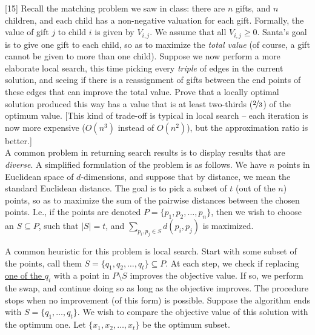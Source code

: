 \documentclass[addpoints]{exam}
\def\mysolution#1{}    %
\begin{document}
\begin{questions}
[15]
Recall the matching problem we saw in class: there are $n$ gifts, and $n$ children,
and each child has a non-negative valuation for each gift. Formally, the value of
gift $j$ to child $i$ is given by $V_{i,j}$. We assume that all $V_{i,j} \ge 0$.
Santa's goal is to give one gift to each child, so as to maximize the {\em total
value} (of course, a gift cannot be given to more than one child).
Suppose we now perform a more elaborate local search, this time picking every {\em
triple} of edges in the current solution, and seeing if there is a reassignment of
gifts between the end points of these edges that can improve the total value. Prove
that a locally optimal solution produced this way has a value that is at least two-thirds ($\nicefrac{2}{3}$) of the optimum value. [This kind of trade-off is typical in local search --
each iteration is now more expensive ($O(n^3)$ instead of $O(n^2)$), but the
approximation ratio is better.]\\


\mysolution{
    
}



A common problem in returning search results is to display results that are {\em diverse}. A simplified formulation of the problem is as follows. We have $n$ points in Euclidean space of $d$-dimensions, and suppose that by distance, we mean the standard Euclidean distance. The goal is to pick a subset of $t$ (out of the $n$) points, so as to maximize the sum of the pairwise distances between the chosen points. 
I.e., if the points are denoted $P = \{p_1, p_2, \dots, p_n\}$, then we wish to choose an $S \subseteq P$, such that $|S| = t$, and $\sum_{p_i, p_j \in S} d(p_i, p_j)$ is maximized.

A common heuristic for this problem is local search. Start with some subset of the points, call them $S = \{q_1, q_2, \dots, q_t\} \subseteq P$. At each step, we check if replacing \underline{one of the $q_i$} with a point in $P \setminus S$ improves the objective value.  If so, we perform the swap, and continue doing so as long as the objective improves. The procedure stops when no improvement (of this form) is possible. Suppose the algorithm ends with $S = \{q_1, \dots, q_t\}$.  We wish to compare the objective value of this solution with the optimum one. Let $\{x_1, x_2, \dots, x_t\}$ be the optimum subset. 

\begin{parts}

\end{parts}
\end{questions}
\end{document}
